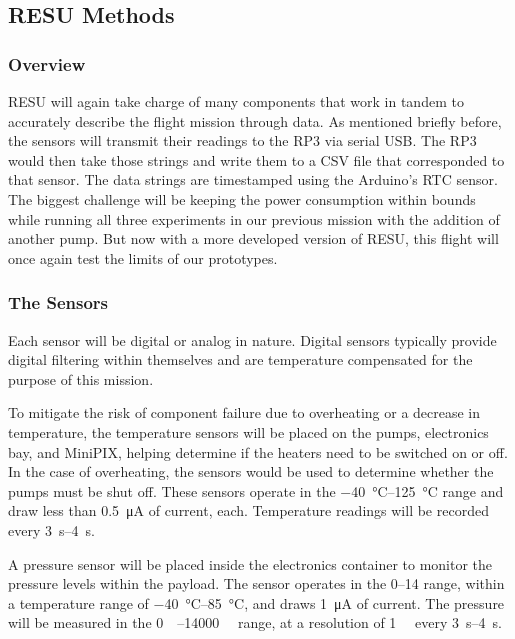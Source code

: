 \subsection{RESU Methods}
\label{sec:RESU}


\subsubsection{Overview}

RESU will again take charge of many components that work in tandem to accurately describe the flight mission through data.  As mentioned briefly before, the sensors will transmit their readings to the RP3 via serial USB.  The RP3 would then take those strings and write them to a CSV file that corresponded to that sensor.  The data strings are timestamped using the Arduino's RTC sensor.  The biggest challenge will be keeping the power consumption within bounds while running all three experiments
in our previous mission with the addition of another pump.  But now with a more developed version of RESU, this flight will once again test the limits of our prototypes.

\subsubsection{The Sensors}

Each sensor will be digital or analog in nature.  Digital sensors typically provide digital filtering within themselves and are temperature compensated for the purpose of this mission. 
   
To mitigate the risk of component failure due to overheating or a decrease in temperature, the temperature sensors will be placed on the pumps, electronics bay, and MiniPIX, helping determine if the heaters need to be switched on or off.  In the case of overheating, the sensors would be used to determine whether the pumps must be shut off.  These sensors operate in the \SIrange{-40}{125}{\celsius} range and draw less than \SI{0.5}{\micro\ampere} of current, each.  Temperature readings will be recorded every \SIrange{3}{4}{\second}.

A pressure sensor will be placed inside the electronics container to monitor the pressure levels within the payload.  The sensor operates in the \SIrange{0}{14}{\bara} range, within a temperature range of \SIrange{-40}{85}{\celsius}, and draws \SI{1}{\micro\ampere} of current.  The pressure will be measured in the \SIrange{0}{14000}{\milli\bara} range, at a resolution of \SI{1}{\milli\bara} every \SIrange{3}{4}{\second}.

